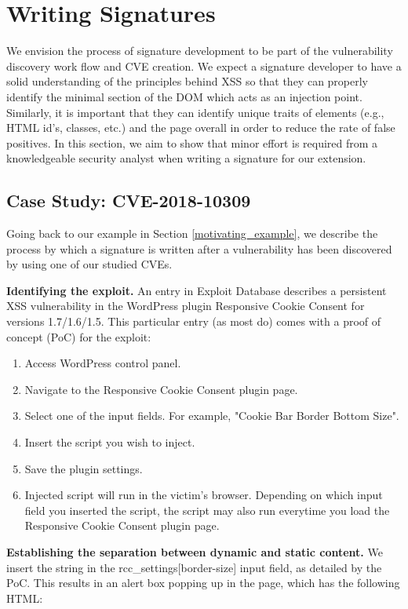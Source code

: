 \section{Writing Signatures} \label{signature_writing}

We envision the process of signature development to be part of the vulnerability discovery work flow and CVE creation. We expect a signature developer to have a solid understanding of the principles behind \ac{XSS} so that they can properly identify the minimal section of the DOM which acts as an injection point. Similarly, it is important that they can identify unique traits of elements (e.g., HTML id's, classes, etc.) and the page overall in order to reduce the rate of false positives. In this section, we aim to show that minor effort is required from a knowledgeable security analyst when writing a signature for our extension.


\subsection{Case Study: CVE-2018-10309} \label{case_study}
Going back to our example in Section \ref{motivating_example}, we describe the process by which a signature is written after a vulnerability has been discovered by using one of our studied CVEs.  

\textbf{Identifying the exploit.} An entry in Exploit Database \cite{studyCVE} describes a persistent \ac{XSS} vulnerability in the WordPress plugin Responsive Cookie Consent for versions 1.7/1.6/1.5. This particular entry (as most do) comes with a proof of concept (PoC) for the exploit: 
\begin{enumerate}
	\item Access WordPress control panel.
	\item Navigate to the Responsive Cookie Consent plugin page.
	\item Select one of the input fields. For example, "Cookie Bar Border Bottom Size".
	\item Insert the script you wish to inject.
	\item Save the plugin settings.
	\item Injected script will run in the victim's browser. Depending on which input field you inserted the script, the script may also run everytime you load the Responsive Cookie Consent plugin page.
	
\end{enumerate}

\textbf{Establishing the separation between dynamic and static content.} We insert the string  in the rcc\_settings[border-size] input field, as detailed by the PoC. This results in an alert box popping up in the page, which has the  following HTML:

